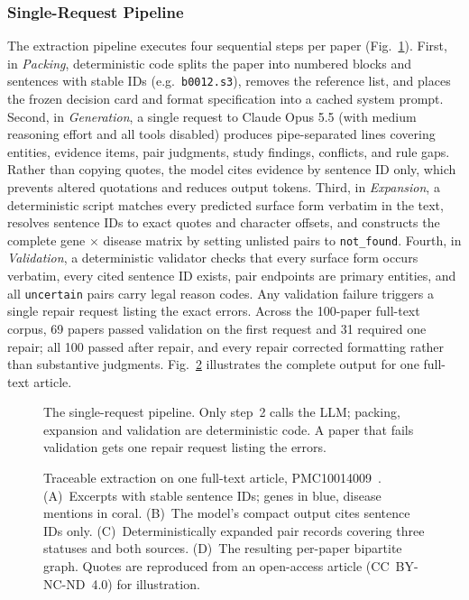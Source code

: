 \documentclass[preprint,10pt,letterpaper]{elsarticle}
\newcommand{\st}[1]{\texttt{#1}}             %
\begin{document}
\subsubsection{Single-Request Pipeline}
The extraction pipeline executes four sequential steps per paper (Fig.~\ref{fig:pipeline}). First, in \emph{Packing}, deterministic code splits the paper into numbered blocks and sentences with stable IDs (e.g.\ \texttt{b0012.s3}), removes the reference list, and places the frozen decision card and format specification into a cached system prompt. Second, in \emph{Generation}, a single request to Claude Opus 5.5 (with medium reasoning effort and all tools disabled) produces pipe-separated lines covering entities, evidence items, pair judgments, study findings, conflicts, and rule gaps. Rather than copying quotes, the model cites evidence by sentence ID only, which prevents altered quotations and reduces output tokens. Third, in \emph{Expansion}, a deterministic script matches every predicted surface form verbatim in the text, resolves sentence IDs to exact quotes and character offsets, and constructs the complete gene $\times$ disease matrix by setting unlisted pairs to \st{not\_found}. Fourth, in \emph{Validation}, a deterministic validator checks that every surface form occurs verbatim, every cited sentence ID exists, pair endpoints are primary entities, and all \st{uncertain} pairs carry legal reason codes. Any validation failure triggers a single repair request listing the exact errors. Across the 100-paper full-text corpus, 69 papers passed validation on the first request and 31 required one repair; all 100 passed after repair, and every repair corrected formatting rather than substantive judgments. Fig.~\ref{fig:example} illustrates the complete output for one full-text article.

\begin{figure}[!htbp]
\centering
\resizebox{\linewidth}{!}{}
\caption{The single-request pipeline. Only step~2 calls the LLM; packing, expansion and validation are deterministic code. A paper that fails validation gets one repair request listing the errors.}
\label{fig:pipeline}
\end{figure}

\begin{figure}[!htbp]
\centering
\resizebox{\linewidth}{!}{}
\caption{Traceable extraction on one full-text article, PMC10014009~\cite{kim2023fccm}. (A)~Excerpts with stable sentence IDs; genes in blue, disease mentions in coral. (B)~The model's compact output cites sentence IDs only. (C)~Deterministically expanded pair records covering three statuses and both sources. (D)~The resulting per-paper bipartite graph. Quotes are reproduced from an open-access article (CC~BY-NC-ND~4.0) for illustration.}
\label{fig:example}
\end{figure}
\end{document}
